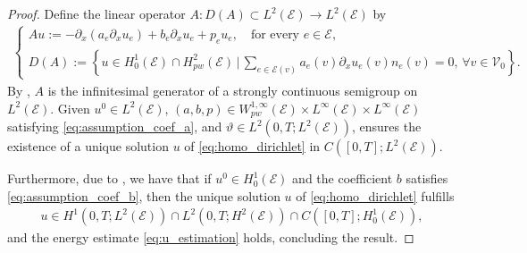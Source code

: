 \documentclass[10pt,a4paper]{amsart}
\def\to{\rightarrow}
\begin{document}
\begin{proof}
    Define the linear operator $A: D(A) \subset L^2(\mathcal{E}) \to L^2(\mathcal{E})$ by
    \begin{align}\label{def_A_heat}
    \begin{cases} Au := - \partial_x(a_e \partial_x u_e) + b_e \partial_x u_e + p_e u_e, \quad \text{for every } e \in \mathcal{E}, \\
    D(A) := \left\{ u \in H^1_0(\mathcal{E}) \cap H_{pw}^2(\mathcal{E}) \,\Big|\, \sum_{e \in \mathcal{E}(v)} a_e(v)\partial_x u_e(v) n_e(v) = 0, \, \forall v \in \mathcal{V}_0 \right\}.
        \end{cases}
    \end{align}
    By , $A$ is the infinitesimal generator of a strongly continuous semigroup on $L^2(\mathcal{E})$. Given $u^0 \in L^2(\mathcal{E})$, $(a, b, p) \in W^{1,\infty}_{pw}(\mathcal{E}) \times L^{\infty}(\mathcal{E}) \times L^{\infty}(\mathcal{E})$ satisfying \eqref{eq:assumption_coef_a}, and $\vartheta \in L^2(0, T; L^2(\mathcal{E}))$, \cite[Proposition 3.1]{Bensoussan} ensures the existence of a unique solution $u$ of \eqref{eq:homo_dirichlet} in $C([0, T]; L^2(\mathcal{E}))$.
    
    Furthermore, due to , we have that if $u^0\in H_0^1(\mathcal{E})$ and the coefficient $b$ satisfies \eqref{eq:assumption_coef_b}, then the unique solution $u$ of \eqref{eq:homo_dirichlet} fulfills
    \begin{align*}
        u \in H^1(0, T; L^2(\mathcal{E})) \cap L^2(0, T; H^2(\mathcal{E})) \cap C([0, T]; H_0^1(\mathcal{E})),
    \end{align*}
    and the energy estimate \eqref{eq:u_estimation} holds, concluding the result.
\end{proof}
\end{document}

